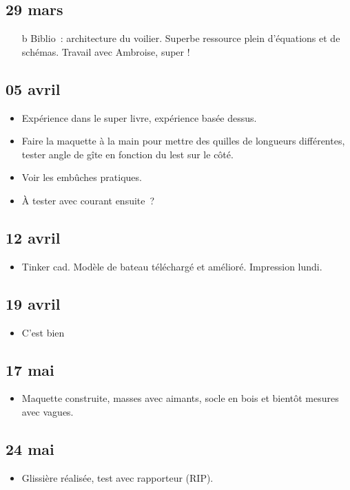 \documentclass[a4paper, 11pt, final, garamond]{book}
\begin{document}
\subsection{29 mars}
\begin{itemize}
	\item[b]{Biblio}~: architecture du voilier. Superbe ressource plein d'équations
	et de schémas. Travail avec Ambroise, super !
\end{itemize}

\subsection{05 avril}
\begin{itemize}
	\item Expérience dans le super livre, expérience basée dessus.
	\item Faire la maquette à la main pour mettre des quilles de longueurs
	      différentes, tester angle de gîte en fonction du lest sur le côté.
	\item Voir les embûches pratiques.
	\item À tester avec courant ensuite~?
\end{itemize}

\subsection{12 avril}
\begin{itemize}
	\item Tinker cad. Modèle de bateau téléchargé et amélioré. Impression lundi.
\end{itemize}

\subsection{19 avril}
\begin{itemize}
	\item C'est bien
\end{itemize}

\subsection{17 mai}
\begin{itemize}
	\item Maquette construite, masses avec aimants, socle en bois et bientôt
	      mesures avec vagues.
\end{itemize}

\subsection{24 mai}
\begin{itemize}
	\item Glissière réalisée, test avec rapporteur (RIP).
\end{itemize}
\end{document}
